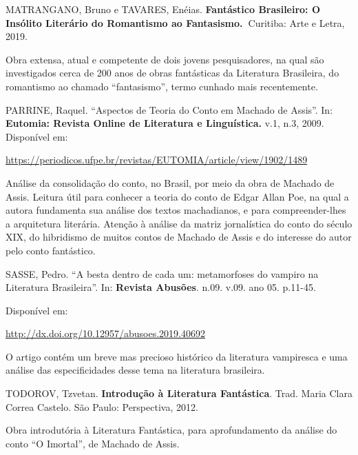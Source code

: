 \documentclass{extarticle}
\begin{document}
MATRANGANO, Bruno e TAVARES, Enéias. \textbf{Fantástico Brasileiro: O
Insólito Literário do Romantismo ao Fantasismo.~}Curitiba: Arte e Letra,
2019.

Obra extensa, atual e competente de dois jovens pesquisadores, na qual
são investigados cerca de 200 anos de obras fantásticas da Literatura
Brasileira, do romantismo ao chamado ``fantasismo'', termo cunhado mais
recentemente.

PARRINE, Raquel. ``Aspectos de Teoria do Conto em Machado de Assis''.
In: \textbf{Eutomia: Revista Online de Literatura e Linguística.} v.1,
n.3, 2009. Disponível em:

\url{https://periodicos.ufpe.br/revistas/EUTOMIA/article/view/1902/1489}

Análise da consolidação do conto, no Brasil, por meio da obra de Machado
de Assis. Leitura útil para conhecer a teoria do conto de Edgar Allan
Poe, na qual a autora fundamenta sua análise dos textos machadianos, e
para compreender-lhes a arquitetura literária. Atenção à análise da
matriz jornalística do conto do século XIX, do hibridismo de muitos
contos de Machado de Assis e do interesse do autor pelo conto
fantástico.

SASSE, Pedro. ``A besta dentro de cada um: metamorfoses do vampiro na
Literatura Brasileira''. In: \textbf{Revista Abusões}. n.09. v.09. ano
05. p.11-45.

Disponível em:

\url{http://dx.doi.org/10.12957/abusoes.2019.40692}

O artigo contém um breve mas precioso histórico da literatura vampiresca
e uma análise das especificidades desse tema na literatura brasileira.

TODOROV, Tzvetan. \textbf{Introdução à Literatura Fantástica}. Trad.
Maria Clara Correa Castelo. São Paulo: Perspectiva, 2012.

Obra introdutória à Literatura Fantástica, para aprofundamento da
análise do conto ``O Imortal'', de Machado de Assis.
\end{document}
